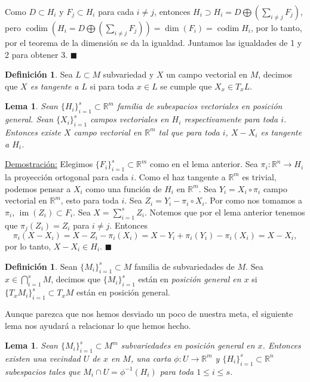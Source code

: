 \documentclass{report}
\newtheorem{lem}[theorem]{Lema}
\theoremstyle{definition}
\newtheorem{defi}[theorem]{Definici\'on}
\DeclareMathOperator{\cod}{codim}
\DeclareMathOperator{\im}{im}
\begin{document}
Como $D \subset H_i$ y $F_j \subset H_i$ para cada $i \neq j$, entonces $H_i \supset H_i = D \bigoplus( \sum\limits_{i\neq j} F_j)$, pero $\cod (H_i = D \bigoplus( \sum\limits_{i\neq j} F_j))= \dim (F_i) = \cod H_i$, por lo tanto, por el teorema de la dimensi\'on se da la igualdad. Juntamos las igualdades de 1 y 2 para obtener 3. $\blacksquare$

\begin{defi}
Sea $L \subset M$ subvariedad y $X$ un campo vectorial en $M$, decimos que \textit{$X$ es tangente a $L$} si para toda $x \in L$ se cumple que $X_x \in T_x L$.
\end{defi}

\begin{lem}
Sean $\{ H_i \}_{i=1}^s \subset \mathbb{R}^m$ familia de subespacios vectoriales en posici\'on general. Sean $\{ X_i \}_{i=1}^s$ campos vectoriales en $H_i$ respectivamente para toda $i$. Entonces existe $X $ campo vectorial en $\mathbb{R}^m$ tal que para toda $i$, $X - X_i$ es tangente a $H_i$.
\end{lem}

\underline{Demostraci\'on:} Elegimos $\{ F_i \}_{i=1}^s \subset \mathbb{R}^m$ como en el lema anterior. Sea $\pi_i: \mathbb{R}^n \to H_i$ la proyecci\'on ortogonal para cada $i$. Como el haz tangente a $\mathbb{R}^m$ es trivial, podemos pensar a $X_i$ como una funci\'on de $H_i$ en $\mathbb{R}^m$. Sea $Y_i = X_i \circ \pi_i$ campo vectorial en $\mathbb{R}^m$, esto para toda $i$. Sea $Z_i = Y_i - \pi_i \circ X_i$. Por como nos tomamos a $\pi_i$, $\im(Z_i) \subset F_i$. Sea $X = \sum\limits_{i=1}^s Z_i$. Notemos que por el lema anterior tenemos que $\pi_j (Z_i) = Z_i$ para $i \neq j$. Entonces 
$$\pi_i (X - X_i) = X - Z_i  - \pi_i (X_i) = X - Y_i + \pi_i(Y_i) - \pi_i (X_i) = X - X_i ,$$
por lo tanto, $X -X_i \in H_i$. $\blacksquare$


\begin{defi}
Sean $\{ M_i \}_{i=1}^s \subset M$ familia de subvariedades de $M$. Sea $x \in \bigcap\limits_{i=1}^s M$, decimos que $\{ M_i \}_{i=1}^s$ est\'an en \textit{posici\'on general en $x$} si $\{ T_x M_i \}_{i =1}^s \subset T_x M$ est\'an en posici\'on general.
\end{defi}

Aunque parezca que nos hemos desviado un poco de nuestra meta, el siguiente lema nos ayudar\'a a relacionar lo que hemos hecho.

\begin{lem}
Sean $\{ M_i \}_{i=1}^s \subset M^m$ subvariedades en posici\'on general en $x$. Entonces existen una vecindad $U$ de $x$ en $M$, una carta $\phi: U \to \mathbb{R}^m$ y $\{ H_i \}_{i=1}^s \subset \mathbb{R}^n$ subespacios tales que $M_i \cap U = \phi^{-1} (H_i)$ para toda $1 \leq i \leq s$.
\end{lem}
\end{document}
